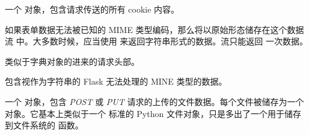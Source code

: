 \documentclass[a4paper,12pt]{sphinxmanual}
\begin{document}
\begin{fulllineitems}
\begin{fulllineitems}
\end{fulllineitems}


\begin{fulllineitems}
\label{api:flask.Request.cookies}
一个 \href{http://docs.python.org/dev/library/stdtypes.html\#dict}{} 对象，包含请求传送的所有 cookie 内容。

\end{fulllineitems}


\begin{fulllineitems}
\label{api:flask.Request.stream}
如果表单数据无法被已知的 MIME 类型编码，那么将以原始形态储存在这个数据流
中。大多数时候，应当使用 {\hyperref[api:flask.Request.data]{}} 来返回字符串形式的数据。流只能返回
一次数据。

\end{fulllineitems}


\begin{fulllineitems}
\label{api:flask.Request.headers}
类似于字典对象的进来的请求头部。

\end{fulllineitems}


\begin{fulllineitems}
\label{api:flask.Request.data}
包含视作为字符串的 Flask 无法处理的 MINE 类型的数据。

\end{fulllineitems}


\begin{fulllineitems}
\label{api:flask.Request.files}
一个 \href{http://werkzeug.pocoo.org/docs/datastructures/\#werkzeug.datastructures.MultiDict}{} 对象，包含 \emph{POST} 或
\emph{PUT} 请求的上传的文件数据。每个文件被储存为一个
\href{http://werkzeug.pocoo.org/docs/datastructures/\#werkzeug.datastructures.FileStorage}{} 对象。它基本上类似于一个
标准的 Python 文件对象，只是多出了一个用于储存到文件系统的
\href{http://werkzeug.pocoo.org/docs/datastructures/\#werkzeug.datastructures.FileStorage.save}{} 函数。


\end{fulllineitems}
\end{fulllineitems}
\end{document}
